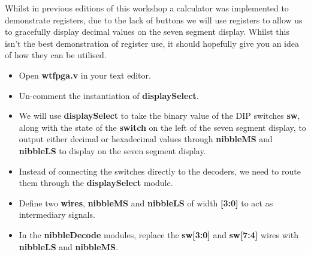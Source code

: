 \documentclass[12pt,a4paper]{article}
\begin{document}
\noindent
Whilst in previous editions of this workshop a calculator was implemented to demonstrate registers, due to the lack of buttons we will use registers to allow us to gracefully display decimal values on the seven segment display. Whilst this isn't the best demonstration of register use, it should hopefully give you an idea of how they can be utilised.

\begin{itemize}
	\item Open \textbf{wtfpga.v} in your text editor. 
	\item Un-comment the instantiation of \textbf{displaySelect}.
	\item We will use \textbf{displaySelect} to take the binary value of the DIP switches \textbf{sw}, along with the state of the \textbf{switch} on the left of the seven segment display, to output either decimal or hexadecimal values through \textbf{nibbleMS} and \textbf{nibbleLS} to display on the seven segment display. 
	\item Instead of connecting the switches directly to the decoders, we need to route them through the \textbf{displaySelect} module. 
	\item Define two \textbf{wires}, \textbf{nibbleMS} and \textbf{nibbleLS} of width \textbf{[3:0]} to act as intermediary signals.
	\item In the \textbf{nibbleDecode} modules, replace the \textbf{sw[3:0]} and \textbf{sw[7:4]} wires with \textbf{nibbleLS} and \textbf{nibbleMS}.	
\end{itemize} 
\end{document}
